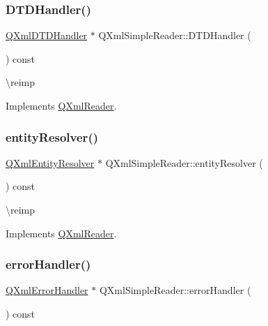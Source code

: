 \subsubsection{\texorpdfstring{DTDHandler()}{DTDHandler()}}
{\footnotesize\ttfamily \mbox{\hyperlink{class_q_xml_d_t_d_handler}{Q\+Xml\+D\+T\+D\+Handler}} $\ast$ Q\+Xml\+Simple\+Reader\+::\+D\+T\+D\+Handler (\begin{DoxyParamCaption}{ }\end{DoxyParamCaption}) const\hspace{0.3cm}{\ttfamily [virtual]}}

\textbackslash{}reimp 

Implements \mbox{\hyperlink{class_q_xml_reader_a5c40696cea43c1af838e575b7cf7921c}{Q\+Xml\+Reader}}.

\mbox{\label{class_q_xml_simple_reader_a7e754b5b6fc96a4fd477de791c317317}} 
\subsubsection{\texorpdfstring{entityResolver()}{entityResolver()}}
{\footnotesize\ttfamily \mbox{\hyperlink{class_q_xml_entity_resolver}{Q\+Xml\+Entity\+Resolver}} $\ast$ Q\+Xml\+Simple\+Reader\+::entity\+Resolver (\begin{DoxyParamCaption}{ }\end{DoxyParamCaption}) const\hspace{0.3cm}{\ttfamily [virtual]}}

\textbackslash{}reimp 

Implements \mbox{\hyperlink{class_q_xml_reader_ad16d14b4da2560aa3f32ea754d8d1104}{Q\+Xml\+Reader}}.

\mbox{\label{class_q_xml_simple_reader_ab490598616bb52328fcc0b78afca6a5f}} 
\subsubsection{\texorpdfstring{errorHandler()}{errorHandler()}}
{\footnotesize\ttfamily \mbox{\hyperlink{class_q_xml_error_handler}{Q\+Xml\+Error\+Handler}} $\ast$ Q\+Xml\+Simple\+Reader\+::error\+Handler (\begin{DoxyParamCaption}{ }\end{DoxyParamCaption}) const\hspace{0.3cm}{\ttfamily [virtual]}}

